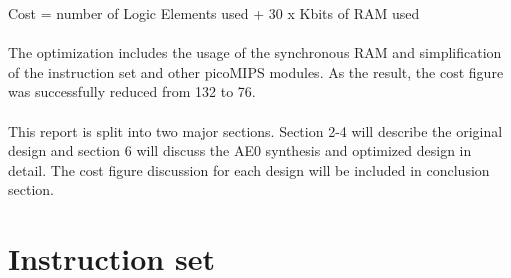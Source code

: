                     Cost = number of Logic Elements used + 30 x Kbits of RAM used\\\\
The optimization includes the usage of the synchronous RAM and simplification of the instruction set and other picoMIPS modules. As the result, the cost figure was successfully reduced from 132 to 76.\\\\
This report is split into two major sections. Section 2-4 will describe the original design and section 6 will discuss the AE0 synthesis and optimized design in detail. The cost figure discussion for each design will be included in conclusion section.
\section{Instruction set} \label{Section:Instruction}

